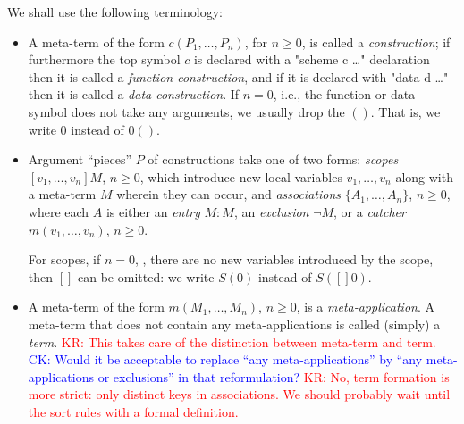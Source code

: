 \documentclass[letterpaper,11pt]{article}
\newcommand{\CK}[1]{\textcolor{blue}{CK: #1}}
\newcommand{\KR}[1]{\textcolor{red}{KR: #1}}
\newcommand{\MS}[1]{\textcolor{violet}{MS: #1}}
\begin{document}
We shall use the following terminology:
\begin{itemize}

\item A meta-term of the form $c(P_1,…,P_n)$, for $n≥0$, is called a \emph{construction}; if furthermore
  the top symbol $c$ is declared with a "scheme c {…}" declaration then it is called a
  \emph{function construction}, and if it is declared with "data d {…}" then it is called a
  \emph{data construction}. If $n=0$, i.e., the function or data symbol does not take any arguments,
  we usually drop the $()$. That is, we write $0$ instead of $0()$.


\item Argument ``pieces'' $P$ of constructions take one of two forms: \emph{scopes} $[v_1,…,v_n]M$,
  $n≥0$, which introduce new local variables $v_1,…,v_n$ along with a meta-term $M$ wherein they can
  occur, and \emph{associations} $\{A_1,…,A_n\}$, $n≥0$, where each $A$ is either an \emph{entry}
  $M:M$, an \emph{exclusion} $¬M$, or a \emph{catcher} $m(v_1,…,v_n)$, $n≥0$.

  For scopes, if $n=0$, \ie, there are no new variables introduced by the scope, then $[]$ can be
  omitted: we write $S(0)$ instead of $S([]0)$.

\item A meta-term of the form $m(M_1,…,M_n)$, $n≥0$, is a \emph{meta-application}.  A meta-term that
  does not contain any meta-applications is called (simply) a \emph{term}.
  \KR{This takes care of the distinction between meta-term and term.}
  \CK{Would it be acceptable to replace ``any meta-applications'' by ``any meta-applications or exclusions'' in that reformulation?}
  \KR{No, term formation is more strict: only distinct keys in associations. We should probably wait
    until the sort rules with a formal definition.}


\end{itemize}
\end{document}
